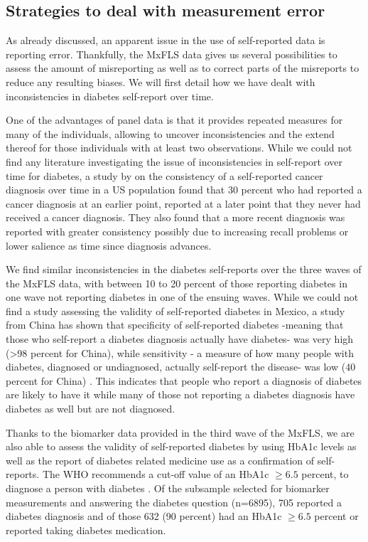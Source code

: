 
\subsection{Strategies to deal with measurement error}

As already discussed, an apparent issue in the use of self-reported data is reporting error.
Thankfully, the \ac{MxFLS} data gives us several possibilities to assess the amount of misreporting as well as to correct parts of the misreports to reduce any resulting biases. We will first detail how we have dealt with inconsistencies in diabetes self-report over time.

One of the advantages of panel data is that it provides repeated
measures for many of the individuals, allowing to uncover inconsistencies
and the extend thereof for those individuals with at least two observations.
While we could not find any literature investigating the issue of inconsistencies in self-report over time for diabetes, a study by \citet{Zajacova2010} on the consistency
of a self-reported cancer diagnosis over time in a US population found
that 30 percent who had reported a cancer diagnosis at an earlier
point, reported at a later point that they never had received a cancer
diagnosis. They also found that a more recent diagnosis was reported
with greater consistency possibly due to increasing recall problems
or lower salience as time since diagnosis advances. 

We find similar inconsistencies in the diabetes self-reports over
the three waves of the \ac{MxFLS} data, with between 10 to 20 percent
of those reporting diabetes in one wave not reporting diabetes in
one of the ensuing waves. While we could not find a study assessing
the validity of self-reported diabetes in Mexico, a study from China
has shown that specificity of self-reported diabetes -meaning that those who self-report a diabetes
diagnosis actually have diabetes- was very high (>98 percent for China), while sensitivity
- a measure of how many people with diabetes, diagnosed or undiagnosed, actually self-report the disease- was low (40 percent for China)
\citep{Yuan2015a}. This indicates that people who report a diagnosis
of diabetes are likely to have it while many of those not reporting a diabetes
diagnosis have diabetes as well but are not diagnosed. 

Thanks to the biomarker data provided in the third wave of the \ac{MxFLS},
we are also able to assess the validity of self-reported diabetes
by using \ac{HbA1c} levels as well as the report of diabetes related
medicine use as a confirmation of self-reports. The \ac{WHO} recommends
a cut-off value of an \ac{HbA1c} $\geq6.5$ percent, to diagnose
a person with diabetes \citep{WorldHealthOrganization2011}. Of the
subsample selected for biomarker measurements and answering the diabetes
question (n=6895), 705 reported a diabetes diagnosis and of those 632 (90 percent) had an \ac{HbA1c} $\geq6.5$ percent or reported taking diabetes medication. 

